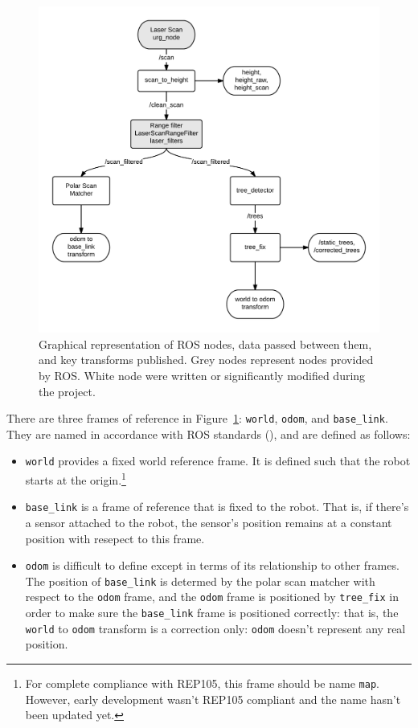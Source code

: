 \documentclass[12pt,oneside,a4paper]{book}
\begin{document}
\begin{figure}[h!]
  \centering
  \includegraphics[width=\textwidth]{figs/roschain}
  \caption{Graphical representation of ROS nodes, data passed between
    them, and key transforms published. Grey nodes represent nodes
    provided by ROS. White node were written or significantly modified
  during the project.}
  \label{fig:roschain}
\end{figure}

There are three frames of reference in Figure~\ref{fig:roschain}:
\texttt{world}, \texttt{odom}, and \texttt{base\_link}. They are named
in accordance with ROS standards (), and are
defined as follows:
\begin{itemize}
\item \texttt{world} provides a fixed world reference frame. It is
  defined such that the robot starts at the origin.\footnote{For
    complete compliance with REP105, this frame should be name
    \texttt{map}. However, early development wasn't REP105 compliant
    and the name hasn't been updated yet.}
\item \texttt{base\_link} is a frame of reference that is fixed to the
  robot. That is, if there's a sensor attached to the robot, the
  sensor's position remains at a constant position with resepect to
  this frame.
\item \texttt{odom} is difficult to define except in terms of its
  relationship to other frames. The position of \texttt{base\_link} is
  determed by the polar scan matcher with respect to the \texttt{odom}
  frame, and the \texttt{odom} frame is positioned by
  \texttt{tree\_fix} in order to make sure the \texttt{base\_link} frame
  is positioned correctly: that is, the \texttt{world} to
  \texttt{odom} transform is a correction only: \texttt{odom} doesn't
  represent any real position.
\end{itemize}
\end{document}
